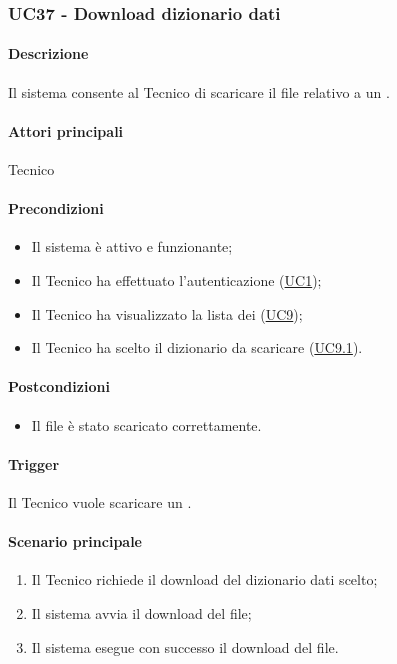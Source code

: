 \subsubsection{UC37 - Download dizionario dati}\label{UC37}
\paragraph*{Descrizione}
Il sistema consente al Tecnico di scaricare il file relativo a un .

\paragraph*{Attori principali}
Tecnico

\paragraph*{Precondizioni}
\begin{itemize}
  \item Il sistema è attivo e funzionante;
  \item Il Tecnico ha effettuato l'autenticazione (\hyperref[UC1]{UC1});
  \item Il Tecnico ha visualizzato la lista dei  (\hyperref[UC9]{UC9});
  \item Il Tecnico ha scelto il dizionario da scaricare (\hyperref[UC9.1]{UC9.1}).
\end{itemize}

\paragraph*{Postcondizioni}
\begin{itemize}
  \item Il file è stato scaricato correttamente.
\end{itemize}

\paragraph*{Trigger}
Il Tecnico vuole scaricare un .

\paragraph*{Scenario principale}
\begin{enumerate}
  \item Il Tecnico richiede il download del dizionario dati scelto;
  \item Il sistema avvia il download del file;
  \item Il sistema esegue con successo il download del file.
\end{enumerate}

